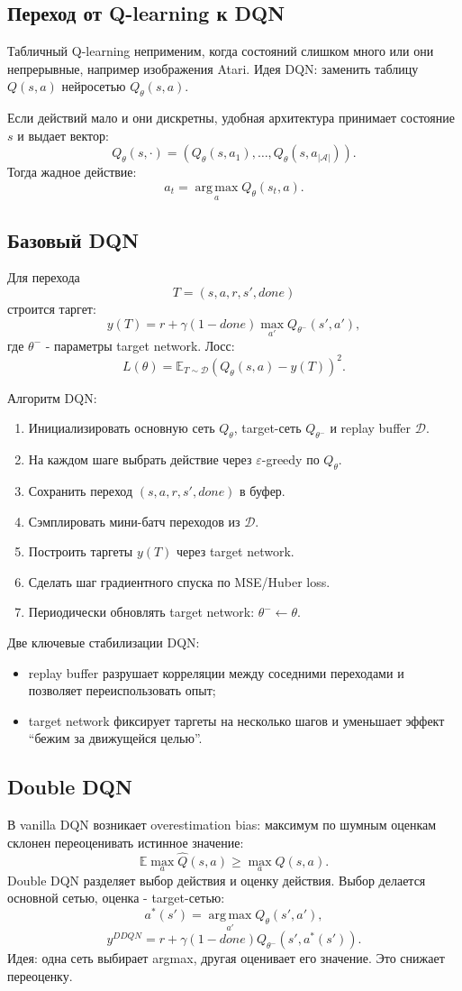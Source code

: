 \documentclass[11pt,a4paper]{article}
\newcommand{\E}{\mathbb{E}}
\newcommand{\argmax}{\operatorname*{arg\,max}}
\newcommand{\1}{\mathbf{1}}
\newcommand{\cA}{\mathcal A}
\newcommand{\cD}{\mathcal D}
\begin{document}
\subsection*{Переход от Q-learning к DQN}
Табличный Q-learning неприменим, когда состояний слишком много или они непрерывные, например изображения Atari. Идея DQN: заменить таблицу $Q(s,a)$ нейросетью $Q_\theta(s,a)$.

Если действий мало и они дискретны, удобная архитектура принимает состояние $s$ и выдает вектор:
\[
    Q_\theta(s,\cdot)=\left(Q_\theta(s,a_1),\dots,Q_\theta(s,a_{|\cA|})\right).
\]
Тогда жадное действие:
\[
    a_t=\argmax_a Q_\theta(s_t,a).
\]

\subsection*{Базовый DQN}
Для перехода
\[
    T=(s,a,r,s',done)
\]
строится таргет:
\[
    y(T)=r+\gamma(1-done)\max_{a'}Q_{\theta^-}(s',a'),
\]
где $\theta^-$ - параметры target network. Лосс:
\[
    L(\theta)=\E_{T\sim \cD}\left(Q_\theta(s,a)-y(T)\right)^2.
\]

Алгоритм DQN:
\begin{enumerate}
    \item Инициализировать основную сеть $Q_\theta$, target-сеть $Q_{\theta^-}$ и replay buffer $\cD$.
    \item На каждом шаге выбрать действие через $\varepsilon$-greedy по $Q_\theta$.
    \item Сохранить переход $(s,a,r,s',done)$ в буфер.
    \item Сэмплировать мини-батч переходов из $\cD$.
    \item Построить таргеты $y(T)$ через target network.
    \item Сделать шаг градиентного спуска по MSE/Huber loss.
    \item Периодически обновлять target network: $\theta^-\leftarrow\theta$.
\end{enumerate}

Две ключевые стабилизации DQN:
\begin{itemize}
    \item replay buffer разрушает корреляции между соседними переходами и позволяет переиспользовать опыт;
    \item target network фиксирует таргеты на несколько шагов и уменьшает эффект ``бежим за движущейся целью''.
\end{itemize}

\subsection*{Double DQN}
В vanilla DQN возникает overestimation bias: максимум по шумным оценкам склонен переоценивать истинное значение:
\[
    \E\max_a \hat Q(s,a)\ge \max_a Q(s,a).
\]
Double DQN разделяет выбор действия и оценку действия. Выбор делается основной сетью, оценка - target-сетью:
\[
    a^*(s')=\argmax_{a'}Q_\theta(s',a'),
\]
\[
    y^{DDQN}=r+\gamma(1-done)Q_{\theta^-}(s',a^*(s')).
\]
Идея: одна сеть выбирает argmax, другая оценивает его значение. Это снижает переоценку.
\end{document}
